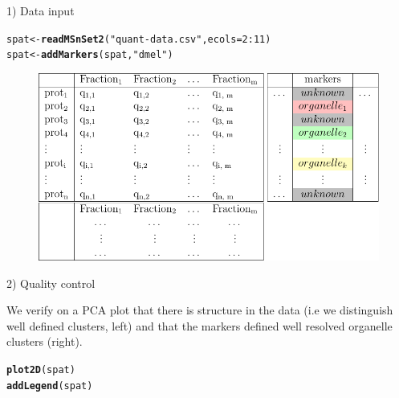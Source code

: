 \documentclass[final]{beamer}\usepackage[]{graphicx}\usepackage[]{color}
\makeatletter
\newcommand{\hlnum}[1]{\textcolor[rgb]{0.686,0.059,0.569}{#1}}%
\newcommand{\hlstr}[1]{\textcolor[rgb]{0.192,0.494,0.8}{#1}}%
\newcommand{\hlopt}[1]{\textcolor[rgb]{0,0,0}{#1}}%
\newcommand{\hlstd}[1]{\textcolor[rgb]{0.345,0.345,0.345}{#1}}%
\newcommand{\hlkwb}[1]{\textcolor[rgb]{0.69,0.353,0.396}{#1}}%
\newcommand{\hlkwc}[1]{\textcolor[rgb]{0.333,0.667,0.333}{#1}}%
\newcommand{\hlkwd}[1]{\textcolor[rgb]{0.737,0.353,0.396}{\textbf{#1}}}%
\newenvironment{kframe}{%
 \def\at@end@of@kframe{}%
 \ifinner\ifhmode%
  \def\at@end@of@kframe{\end{minipage}}%
  \begin{minipage}{\columnwidth}%
 \fi\fi%
 \def\FrameCommand##1{\hskip\@totalleftmargin \hskip-\fboxsep
 \colorbox{shadecolor}{##1}\hskip-\fboxsep
     \hskip-\linewidth \hskip-\@totalleftmargin \hskip\columnwidth}%
 \MakeFramed {\advance\hsize-\width
   \@totalleftmargin\z@ \linewidth\hsize
   \@setminipage}}%
 {\par\unskip\endMakeFramed%
 \at@end@of@kframe}
\newenvironment{knitrout}{}{} %
\makeatother
\begin{document}
\begin{frame}[fragile]
\begin{columns}
\begin{column}{.48\textwidth}
\begin{block}{1) Data input}
\begin{knitrout}
\color{fgcolor}\begin{kframe}
\begin{alltt}
\hlstd{spat} \hlkwb{<-} \hlkwd{readMSnSet2}\hlstd{(}\hlstr{"quant-data.csv"}\hlstd{,} \hlkwc{ecols} \hlstd{=} \hlnum{2}\hlopt{:}\hlnum{11}\hlstd{)}
\hlstd{spat} \hlkwb{<-} \hlkwd{addMarkers}\hlstd{(spat,} \hlstr{"dmel"}\hlstd{)}
\end{alltt}
\end{kframe}
\end{knitrout}
      \end{block}
      \begin{figure}
        \centering
        \includegraphics[width=.75\linewidth]{./figures/Fig1-data-a.pdf}
      \end{figure}
      \bigskip

      \begin{block}{2) Quality control}

        We verify on a PCA plot that there is structure in the data
        (i.e we distinguish well defined clusters, left) and that the
        markers defined well resolved organelle clusters (right).

\begin{knitrout}
\color{fgcolor}\begin{kframe}
\begin{alltt}
\hlkwd{plot2D}\hlstd{(spat)}
\hlkwd{addLegend}\hlstd{(spat)}
\end{alltt}
\end{kframe}
\end{knitrout}


\end{block}
\end{column}
\end{columns}
\end{frame}
\end{document}
